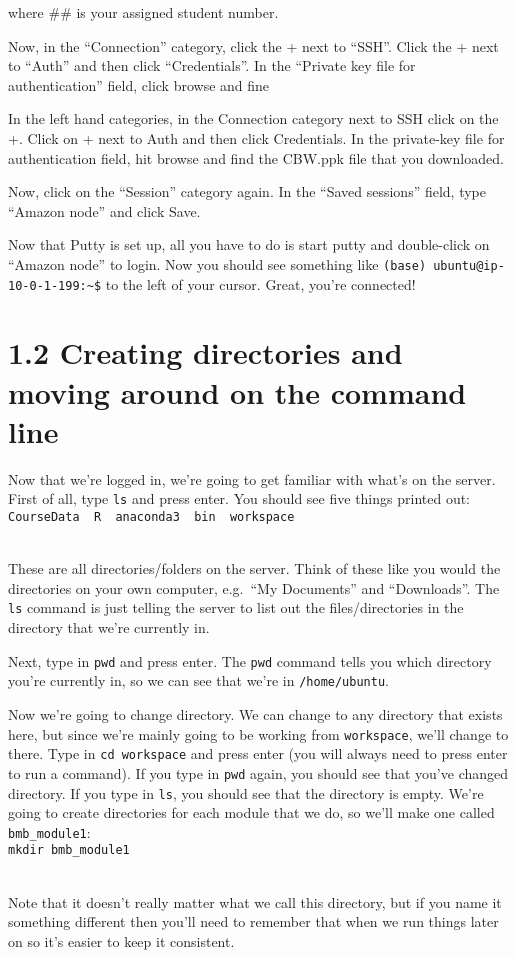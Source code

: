 \documentclass[
]{book}
\begin{document}
where \#\# is your assigned student number.

Now, in the ``Connection'' category, click the + next to ``SSH''. Click the + next to ``Auth'' and then click ``Credentials''. In the ``Private key file for authentication'' field, click browse and fine

In the left hand categories, in the Connection category next to SSH click on the +. Click on + next to Auth and then click Credentials. In the private-key file for authentication field, hit browse and find the CBW.ppk file that you downloaded.

Now, click on the ``Session'' category again. In the ``Saved sessions'' field, type ``Amazon node'' and click Save.

Now that Putty is set up, all you have to do is start putty and double-click on ``Amazon node'' to login. Now you should see something like \texttt{(base)\ ubuntu@ip-10-0-1-199:\textasciitilde{}\$} to the left of your cursor. Great, you're connected!

\section{1.2 Creating directories and moving around on the command line}\label{creating-directories-and-moving-around-on-the-command-line}

Now that we're logged in, we're going to get familiar with what's on the server. First of all, type \texttt{ls} and press enter. You should see five things printed out:\\
\texttt{CourseData\ \ R\ \ anaconda3\ \ bin\ \ workspace}\strut \\
These are all directories/folders on the server. Think of these like you would the directories on your own computer, e.g.~``My Documents'' and ``Downloads''. The \texttt{ls} command is just telling the server to list out the files/directories in the directory that we're currently in.

Next, type in \texttt{pwd} and press enter. The \texttt{pwd} command tells you which directory you're currently in, so we can see that we're in \texttt{/home/ubuntu}.

Now we're going to change directory. We can change to any directory that exists here, but since we're mainly going to be working from \texttt{workspace}, we'll change to there. Type in \texttt{cd\ workspace} and press enter (you will always need to press enter to run a command). If you type in \texttt{pwd} again, you should see that you've changed directory. If you type in \texttt{ls}, you should see that the directory is empty. We're going to create directories for each module that we do, so we'll make one called \texttt{bmb\_module1}:\\
\texttt{mkdir\ bmb\_module1}\strut \\
Note that it doesn't really matter what we call this directory, but if you name it something different then you'll need to remember that when we run things later on so it's easier to keep it consistent.
\end{document}
